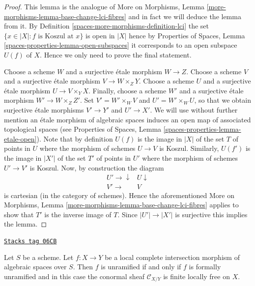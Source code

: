 \begin{proof}
This lemma is the analogue of
More on Morphisms, Lemma \ref{more-morphisms-lemma-base-change-lci-fibres}
and in fact we will deduce the lemma from it. By
Definition \ref{spaces-more-morphisms-definition-lci}
the set $\{x \in |X| : f \text{ is Koszul at }x\}$ is
open in $|X|$ hence by
Properties of Spaces, Lemma \ref{spaces-properties-lemma-open-subspaces}
it corresponds to an open subspace $U(f)$ of $X$. Hence we only need to
prove the final statement.

\medskip\noindent
Choose a scheme $W$ and a surjective \'etale morphism $W \to Z$.
Choose a scheme $V$ and a surjective \'etale morphism $V \to W \times_Z Y$.
Choose a scheme $U$ and a surjective \'etale morphism $U \to V \times_Y X$.
Finally, choose a scheme $W'$ and a surjective \'etale morphism
$W' \to W \times_Z Z'$.
Set $V' = W' \times_W V$ and $U' = W' \times_W U$, so that we obtain
surjective \'etale morphisms $V' \to Y'$ and $U' \to X'$.
We will use without further mention an \'etale morphism of algebraic spaces
induces an open map of associated topological spaces (see
Properties of Spaces, Lemma
\ref{spaces-properties-lemma-etale-open}).
Note that by definition $U(f)$ is the image in $|X|$ of the set $T$
of points in $U$ where the morphism of schemes $U \to V$ is Koszul.
Similarly, $U(f')$ is the image in $|X'|$ of the set $T'$ of points in
$U'$ where the morphism of schemes $U' \to V'$ is Koszul. Now, by construction
the diagram
$$
\begin{array}{cc}U' \longrightarrow\downarrow & U \downarrow \\ V' \longrightarrow & V\end{array}
$$
is cartesian (in the category of schemes). Hence the aforementioned
More on Morphisms, Lemma \ref{more-morphisms-lemma-base-change-lci-fibres}
applies to show that $T'$ is the inverse image of $T$. Since
$|U'| \to |X'|$ is surjective this implies the lemma.
\end{proof}

\begin{lemma}
\label{spaces-more-morphisms-lemma-unramified-lci}
\href{https://stacks.math.columbia.edu/tag/06CB}{\texttt{Stacks tag 06CB}}

Let $S$ be a scheme. Let $f : X \to Y$ be a local complete intersection
morphism of algebraic spaces over $S$. Then $f$ is unramified if and only
if $f$ is formally unramified and in this case the conormal sheaf
$\mathcal{C}_{X/Y}$ is finite locally free on $X$.
\end{lemma}

